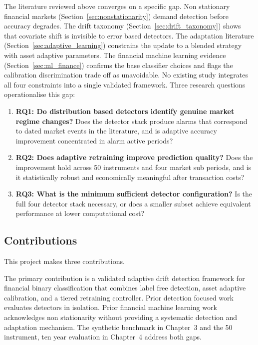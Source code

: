 The literature reviewed above converges on a specific gap. Non stationary financial markets (Section~\ref{sec:nonstationarity}) demand detection before accuracy degrades. The drift taxonomy (Section~\ref{sec:drift_taxonomy}) shows that covariate shift is invisible to error based detectors. The adaptation literature (Section~\ref{sec:adaptive_learning}) constrains the update to a blended strategy with asset adaptive parameters. The financial machine learning evidence (Section~\ref{sec:ml_finance}) confirms the base classifier choices and flags the calibration discrimination trade off as unavoidable. No existing study integrates all four constraints into a single validated framework. Three research questions operationalise this gap:

\begin{enumerate}
  \item \textbf{RQ1: Do distribution based detectors identify genuine market regime
    changes?} Does the detector stack produce alarms that correspond to dated market
    events in the literature, and is adaptive accuracy improvement concentrated in
    alarm active periods?

  \item \textbf{RQ2: Does adaptive retraining improve prediction quality?} Does the
    improvement hold across 50 instruments and four market sub periods, and is it
    statistically robust and economically meaningful after transaction costs?

  \item \textbf{RQ3: What is the minimum sufficient detector configuration?} Is the
    full four detector stack necessary, or does a smaller subset achieve equivalent
    performance at lower computational cost?
\end{enumerate}

\subsection{Contributions}

This project makes three contributions.

The primary contribution is a validated adaptive drift detection framework for financial binary classification that combines label free detection, asset adaptive calibration, and a tiered retraining controller. Prior detection focused work~\cite{rabanser2019,bifet2007adwin} evaluates detectors in isolation. Prior financial machine learning work~\cite{gu2020,krauss2017} acknowledges non stationarity without providing a systematic detection and adaptation mechanism. The synthetic benchmark in Chapter~3 and the 50 instrument, ten year evaluation in Chapter~4 address both gaps.

